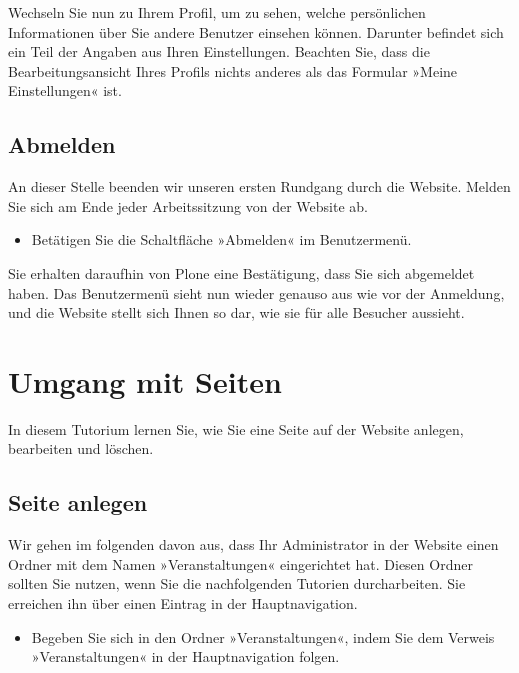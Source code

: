 \documentclass[a4paper,12pt,ngerman]{manual}
\begin{document}
Wechseln Sie nun zu Ihrem Profil, um zu sehen, welche persönlichen
Informationen über Sie andere Benutzer einsehen können. Darunter befindet sich
ein Teil der Angaben aus Ihren Einstellungen. Beachten Sie, dass die
Bearbeitungsansicht Ihres Profils nichts anderes als das Formular »Meine
Einstellungen« ist.


\subsection{Abmelden}

An dieser Stelle beenden wir unseren ersten Rundgang durch die Website. Melden
Sie sich am Ende jeder Arbeitssitzung von der Website ab.
\begin{itemize}
\item {} 
Betätigen Sie die Schaltfläche »Abmelden« im Benutzermenü.

\end{itemize}

Sie erhalten daraufhin von Plone eine Bestätigung, dass Sie sich abgemeldet
haben. Das Benutzermenü sieht nun wieder genauso aus wie vor der Anmeldung,
und die Website stellt sich Ihnen so dar, wie sie für alle Besucher aussieht.

\resetcurrentobjects
\hypertarget{--doc-tutorien/umgang-dokument}{}

\hypertarget{sec-tutorium-dokumente}{}\section{Umgang mit Seiten}

In diesem Tutorium lernen Sie, wie Sie eine Seite auf der Website anlegen,
bearbeiten und löschen.


\subsection{Seite anlegen}

Wir gehen im folgenden davon aus, dass Ihr Administrator in der Website einen
Ordner mit dem Namen »Veranstaltungen« eingerichtet hat. Diesen Ordner sollten
Sie nutzen, wenn Sie die nachfolgenden Tutorien durcharbeiten. Sie erreichen
ihn über einen Eintrag in der Hauptnavigation.
\begin{itemize}
\item {} 
Begeben Sie sich in den Ordner »Veranstaltungen«, indem Sie dem Verweis
»Veranstaltungen« in der Hauptnavigation folgen.

\end{itemize}
\end{document}
